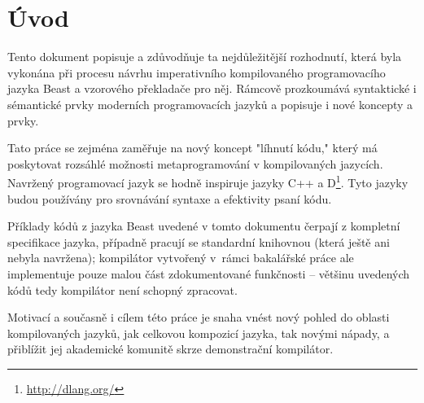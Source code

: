
\newcommand{\ctimeNoXSpace}{\inlineCode{@ctime}}
\newcommand{\ctime}{\ctimeNoXSpace\xspace}
\newcommand{\nonctime}{ne-\inlineCode{@ctime}\xspace}

\renewcommand\chapterautorefname{kapitola}
\renewcommand\sectionautorefname{podkapitola}
\renewcommand\subsectionautorefname{oddíl}
\renewcommand\subsubsectionautorefname{pododdíl}

\chapter{Úvod}
Tento dokument popisuje a zdůvodňuje ta nejdůležitější rozhodnutí, která byla vykonána při procesu návrhu imperativního kompilovaného programovacího jazyka Beast a vzorového překladače pro něj. Rámcově prozkoumává syntaktické i sémantické prvky moderních programovacích jazyků a popisuje i nové koncepty a prvky.

Tato práce se zejména zaměřuje na nový koncept "líhnutí kódu," který má poskytovat rozsáhlé možnosti metaprogramování v kompilovaných jazycích. Navržený programovací jazyk se hodně inspiruje jazyky C++ a D\footnote{\url{http://dlang.org/}}. Tyto jazyky budou používány pro srovnávání syntaxe a efektivity psaní kódu.

Příklady kódů z jazyka Beast uvedené v tomto dokumentu čerpají z kompletní specifikace jazyka, případně pracují se standardní knihovnou (která ještě ani nebyla navržena); kompilátor vytvořený v~rámci bakalářské práce ale implementuje pouze malou část zdokumentované funkčnosti -- většinu uvedených kódů tedy kompilátor není schopný zpracovat.

Motivací a současně i cílem této práce je snaha vnést nový pohled do oblasti kompilovaných jazyků, jak celkovou kompozicí jazyka, tak novými nápady, a přiblížit jej akademické komunitě skrze demonstrační kompilátor.

